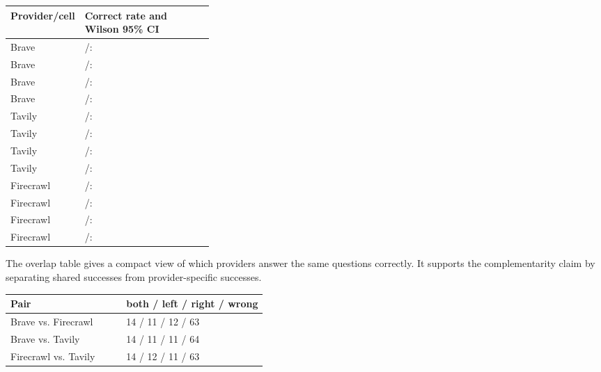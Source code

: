 \begin{center}
\begin{minipage}{\linewidth}
\footnotesize
\begin{tabularx}{\linewidth}{@{}L{0.34\linewidth}Z@{}}
\toprule
\textbf{Provider/cell} & \textbf{Correct rate and Wilson 95\% CI} \\
\midrule
Brave \smart{} & \BraveSmartCorrect{}/\BraveSmartN{}: \BraveSmartRate{} \BraveSmartCI{} \\
Brave \missed{} & \BraveMissedCorrect{}/\BraveMissedN{}: \BraveMissedRate{} \BraveMissedCI{} \\
Brave \blind{} & \BraveBlindCorrect{}/\BraveBlindN{}: \BraveBlindRate{} \BraveBlindCI{} \\
Brave \noop{} & \BraveNoopCorrect{}/\BraveNoopN{}: \BraveNoopRate{} \BraveNoopCI{} \\
Tavily \smart{} & \TavilySmartCorrect{}/\TavilySmartN{}: \TavilySmartRate{} \TavilySmartCI{} \\
Tavily \missed{} & \TavilyMissedCorrect{}/\TavilyMissedN{}: \TavilyMissedRate{} \TavilyMissedCI{} \\
Tavily \blind{} & \TavilyBlindCorrect{}/\TavilyBlindN{}: \TavilyBlindRate{} \TavilyBlindCI{} \\
Tavily \noop{} & \TavilyNoopCorrect{}/\TavilyNoopN{}: \TavilyNoopRate{} \TavilyNoopCI{} \\
Firecrawl \smart{} & \FirecrawlSmartCorrect{}/\FirecrawlSmartN{}: \FirecrawlSmartRate{} \FirecrawlSmartCI{} \\
Firecrawl \missed{} & \FirecrawlMissedCorrect{}/\FirecrawlMissedN{}: \FirecrawlMissedRate{} \FirecrawlMissedCI{} \\
Firecrawl \blind{} & \FirecrawlBlindCorrect{}/\FirecrawlBlindN{}: \FirecrawlBlindRate{} \FirecrawlBlindCI{} \\
Firecrawl \noop{} & \FirecrawlNoopCorrect{}/\FirecrawlNoopN{}: \FirecrawlNoopRate{} \FirecrawlNoopCI{} \\
\bottomrule
\end{tabularx}
\label{tab:app-wilson}
\end{minipage}
\end{center}

The overlap table gives a compact view of which providers answer the same questions correctly. It supports the complementarity claim by separating shared successes from provider-specific successes.

\begin{center}
\footnotesize
\setlength{\tabcolsep}{2pt}
\begin{tabularx}{\linewidth}{@{}L{0.45\linewidth}Y@{}}
\toprule
\textbf{Pair} & \textbf{both / left / right / wrong} \\
\midrule
Brave vs. Firecrawl & 14 / 11 / 12 / 63 \\
Brave vs. Tavily & 14 / 11 / 11 / 64 \\
Firecrawl vs. Tavily & 14 / 12 / 11 / 63 \\
\bottomrule
\end{tabularx}
\label{tab:app-pairwise}
\end{center}

